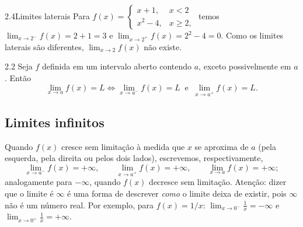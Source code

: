 \begin{exemplo}{2.4}{Limites laterais}
Para $f(x)=\begin{cases}x+1, & x<2\\ x^2-4, & x\ge2,\end{cases}$ temos
$\lim_{x\to2^-}f(x)=2+1=3$ e $\lim_{x\to2^+}f(x)=2^2-4=0$. Como os limites laterais são
diferentes, $\lim_{x\to2}f(x)$ não existe.
\end{exemplo}

\begin{teorema}{2.2}
Seja $f$ definida em um intervalo aberto contendo $a$, exceto possivelmente em $a$. Então
\[
\lim_{x\to a}f(x)=L \iff \lim_{x\to a^-}f(x)=L \ \text{ e } \ \lim_{x\to a^+}f(x)=L .
\]
\end{teorema}

\subsection{Limites infinitos}

Quando $f(x)$ cresce sem limitação à medida que $x$ se aproxima de $a$ (pela esquerda,
pela direita ou pelos dois lados), escrevemos, respectivamente,
\[
\lim_{x\to a^-}f(x)=+\infty,\qquad \lim_{x\to a^+}f(x)=+\infty,\qquad
\lim_{x\to a}f(x)=+\infty ;
\]
analogamente para $-\infty$, quando $f(x)$ decresce sem limitação. Atenção: dizer que o
limite é $\infty$ é uma forma de descrever \emph{como} o limite deixa de existir, pois
$\infty$ não é um número real. Por exemplo, para $f(x)=1/x$:
$\lim_{x\to0^-}\frac1x=-\infty$ e $\lim_{x\to0^+}\frac1x=+\infty$.


